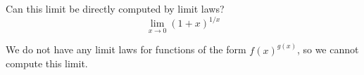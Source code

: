 \documentclass{ximera}
\begin{document}
\begin{question}
  Can this limit be directly computed by limit laws?
  \[
  \displaystyle\lim_{x\to 0}(1+x)^{1/x}
  \]
  \begin{multipleChoice}
  \end{multipleChoice}
  \begin{feedback}
  We do not have any limit laws for functions of the form $f(x)^{g(x)}$, so we cannot compute this limit.
  \end{feedback}
\end{question}
\end{document}
